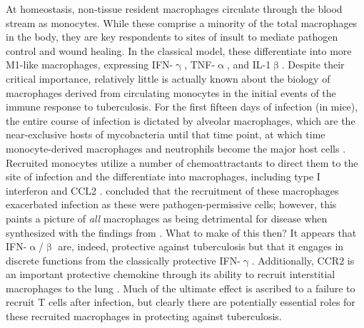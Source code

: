 At homeostasis, non\hyp{}tissue resident macrophages circulate through the blood stream as monocytes. While these comprise a minority of the total macrophages in the body, they are key respondents to sites of insult to mediate pathogen control and wound healing. In the classical model, these differentiate into more M1\hyp{}like macrophages, expressing IFN\hyp{}$\upgamma$, TNF\hyp{}$\upalpha$, and IL\hyp{}1$\upbeta$. Despite their critical importance, relatively little is actually known about the biology of macrophages derived from circulating monocytes in the initial events of the immune response to tuberculosis. For the first fifteen days of infection (in mice), the entire course of infection is dictated by alveolar macrophages, which are the near\hyp{}exclusive hosts of mycobacteria until that time point, at which time monocyte\hyp{}derived macrophages and neutrophils become the major host cells \citep{Cohen2018}. Recruited monocytes utilize a number of chemoattractants to direct them to the site of infection and the differentiate into macrophages, including type I interferon and CCL2 \citep{Antonelli2010, Desvignes2012, Peters2001, Peters2004}. \citeauthor{Antonelli2010} concluded that the recruitment of these macrophages exacerbated infection as these were pathogen\hyp{}permissive cells; however, this paints a picture of \textit{all} macrophages as being detrimental for disease when synthesized with the findings from \citeauthor{Leemans2001}. What to make of this then? It appears that IFN\hyp{}$\upalpha$/$\upbeta$ are, indeed, protective against tuberculosis but that it engages in discrete functions from the classically protective IFN\hyp{}$\upgamma$. Additionally, CCR2 is an important protective chemokine through its ability to recruit interstitial macrophages to the lung \citep{Peters2001}. Much of the ultimate effect is ascribed to a failure to recruit T cells after infection, but clearly there are potentially essential roles for these recruited macrophages in protecting against tuberculosis. 


